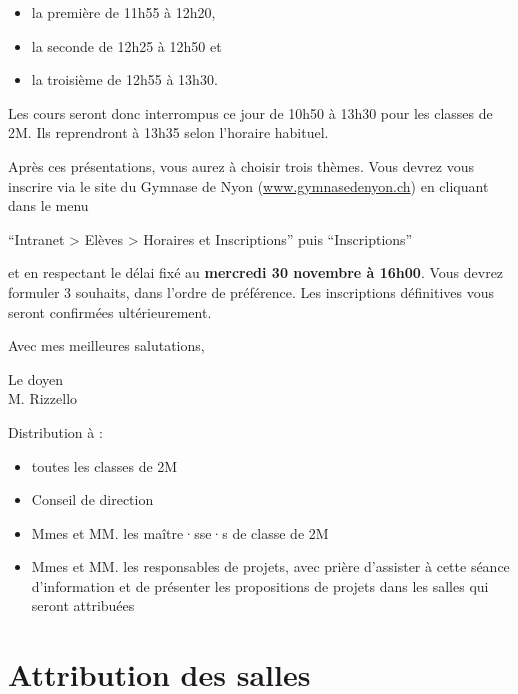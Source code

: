 \documentclass[
  10pt,
  french,
  a5paper,
  openany]{book}
\providecommand{\tightlist}{%
  \setlength{\itemsep}{0pt}\setlength{\parskip}{0pt}}
\newenvironment{signature}{\begin{flushright}}{\end{flushright}}
\begin{document}
\begin{itemize}
\tightlist
\item
  la première de 11h55 à 12h20,
\item
  la seconde de 12h25 à 12h50 et
\item
  la troisième de 12h55 à 13h30.
\end{itemize}

Les cours seront donc interrompus ce jour de 10h50 à 13h30 pour les classes de 2M. Ils reprendront à 13h35 selon l'horaire habituel.

\clearpage

Après ces présentations, vous aurez à choisir trois thèmes. Vous devrez vous inscrire via le site du Gymnase de Nyon (\url{www.gymnasedenyon.ch}) en cliquant dans le menu

\begin{center}
``Intranet \textgreater{} Elèves \textgreater{} Horaires et Inscriptions'' puis ``Inscriptions''

\end{center}

et en respectant le délai fixé au \textbf{mercredi 30 novembre à 16h00}. Vous devrez formuler 3 souhaits, dans l'ordre de préférence. Les inscriptions définitives vous seront confirmées ultérieurement.

Avec mes meilleures salutations,

\begin{signature}
Le doyen\\
M. Rizzello

\end{signature}


Distribution à :

\begin{itemize}
\tightlist
\item
  toutes les classes de 2M
\item
  Conseil de direction
\item
  Mmes et MM. les maître·sse·s de classe de 2M
\item
  Mmes et MM. les responsables de projets, avec prière d'assister à cette séance d'information et de présenter les propositions de projets dans les salles qui seront attribuées
\end{itemize}

\hypertarget{attribution-des-salles}{%
\chapter*{Attribution des salles}\label{attribution-des-salles}}
\end{document}
